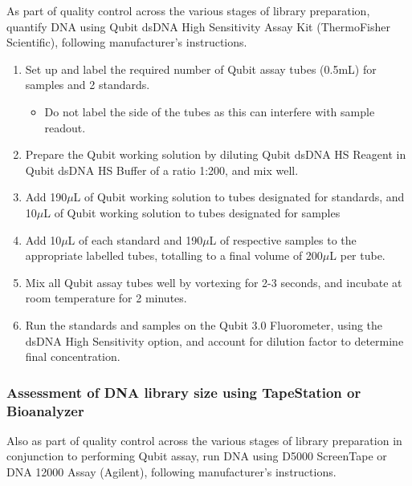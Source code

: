 \label{Isoseq_Protocol_qubit}
As part of quality control across the various stages of library preparation, quantify DNA using Qubit dsDNA High Sensitivity Assay Kit (ThermoFisher Scientific), following manufacturer's instructions.  	
\begin{enumerate}
	\item Set up and label the required number of Qubit assay tubes (0.5mL) for samples and 2 standards. 
	\begin{itemize}
		\item Do not label the side of the tubes as this can interfere with sample readout. 
	\end{itemize} 
	\item Prepare the Qubit working solution by diluting Qubit dsDNA HS Reagent in Qubit dsDNA HS Buffer of a ratio 1:200, and mix well. 
	\item Add 190$\mu$L of Qubit working solution to tubes designated for standards, and 10$\mu$L of Qubit working solution to tubes designated for samples 
	\item Add 10$\mu$L of each standard and 190$\mu$L of respective samples to the appropriate labelled tubes, totalling to a final volume of 200$\mu$L per tube.
	\item Mix all Qubit assay tubes well by vortexing for 2-3 seconds, and incubate at room temperature for 2 minutes. 
	\item Run the standards and samples on the Qubit 3.0 Fluorometer, using the dsDNA High Sensitivity option, and account for dilution factor to determine final concentration. 
\end{enumerate}

\subsubsection{Assessment of DNA library size using TapeStation or Bioanalyzer}
\label{Isoseq_Protocol_tapestation_bioanalyzer}
Also as part of quality control across the various stages of library preparation in conjunction to performing Qubit assay, run DNA using D5000 ScreenTape or DNA 12000 Assay (Agilent), following manufacturer's instructions. 

